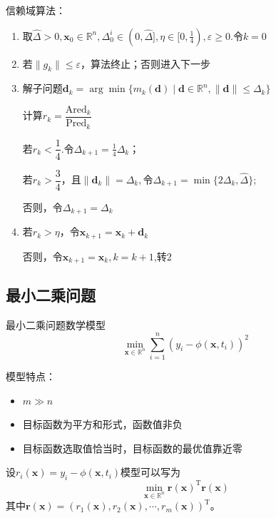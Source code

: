 \begin{note}
    信赖域算法：
    \begin{enumerate}
        \item 取$\hat{\Delta}>0,\boldsymbol{x}_{0}\in\mathbb{R}^{n},\Delta_{0}^{i}\in(0,\hat{\Delta}],\eta\in[0,\frac{1}{4}),\varepsilon\geqslant 0.$令$k = 0$
        \item 若$\|g_k\|\leqslant\varepsilon $，算法终止；否则进入下一步
        \item 解子问题$ \boldsymbol{d}_k=\arg\min\{m_k(\boldsymbol{d})\mid\boldsymbol{d}\in\mathbb{R}^n,\lVert\boldsymbol{d}\rVert\leqslant\Delta_k\} $
        
        计算$r_{k}={\dfrac{\mathrm{Ared}_{k}}{\mathrm{Pred}_{k}}}$

        若$r_{k}<\dfrac{1}{4}.$令$\Delta_{k+1}=\frac{1}{4}\Delta_{k}$；
        
        若$r_{k}>\dfrac34$，且$\|\boldsymbol{d}_{k}\|=\Delta_{k},$令$\Delta_{k+1}=\min\{2\Delta_{k},\hat{\Delta}\}$;

        否则，令$\Delta_{k+1} = \Delta_k$
        \item 若$r_{k}>\eta$，令$\boldsymbol{x}_{k+1} = \boldsymbol{x}_k+\boldsymbol{d}_k$
        
        否则，令$\boldsymbol{x}_{k+1}=\boldsymbol{x}_{k},k=k+1$,转2
    \end{enumerate}
\end{note}

\subsection{最小二乘问题}
最小二乘问题数学模型
\[
    \min\limits_{\boldsymbol{x}\in \mathbb{R}^n}\sum\limits_{i = 1}^{n}\left( y_i-\phi(\boldsymbol{x},t_i) \right)^2
\]
\begin{note}
    模型特点：
    \begin{itemize}
        \item $m\gg n$
        \item 目标函数为平方和形式，函数值非负
        \item 目标函数选取值恰当时，目标函数的最优值靠近零
    \end{itemize}
\end{note}
设$r_i(\boldsymbol{x}) = y_i-\phi(\boldsymbol{x},t_i)$模型可以写为
\[
    \min\limits_{\boldsymbol{x}\in \mathbb{R}^n}\boldsymbol{r}(\boldsymbol{x})^{\mathrm{T}}\boldsymbol{r}(\boldsymbol{x})
\]
其中$\boldsymbol{r}(\boldsymbol{x})=(r_1(\boldsymbol{x}),r_2(\boldsymbol{x}),\cdots,r_m(\boldsymbol{x}))^{\mathrm{T}}$。
